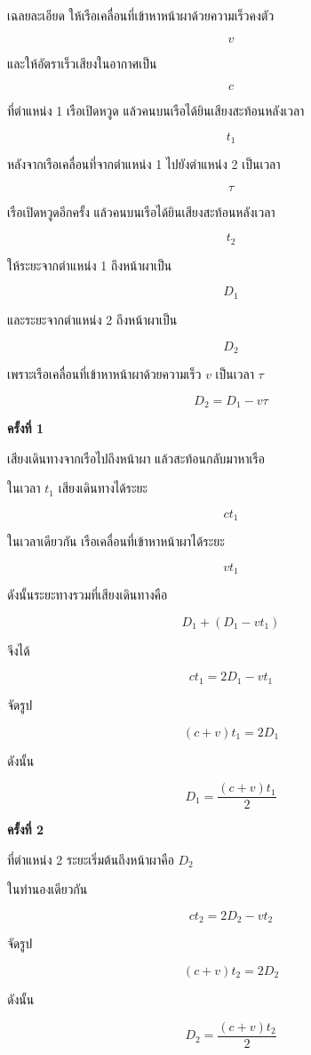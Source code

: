\begin{examplebox}{เฉลยละเอียด}
ให้เรือเคลื่อนที่เข้าหาหน้าผาด้วยความเร็วคงตัว

\[
v
\]

และให้อัตราเร็วเสียงในอากาศเป็น

\[
c
\]

ที่ตำแหน่ง 1 เรือเปิดหวูด แล้วคนบนเรือได้ยินเสียงสะท้อนหลังเวลา

\[
t_1
\]

หลังจากเรือเคลื่อนที่จากตำแหน่ง 1 ไปยังตำแหน่ง 2 เป็นเวลา

\[
\tau
\]

เรือเปิดหวูดอีกครั้ง แล้วคนบนเรือได้ยินเสียงสะท้อนหลังเวลา

\[
t_2
\]

ให้ระยะจากตำแหน่ง 1 ถึงหน้าผาเป็น

\[
D_1
\]

และระยะจากตำแหน่ง 2 ถึงหน้าผาเป็น

\[
D_2
\]

เพราะเรือเคลื่อนที่เข้าหาหน้าผาด้วยความเร็ว $v$ เป็นเวลา $\tau$

\[
D_2=D_1-v\tau
\]

\textbf{ครั้งที่ 1}

เสียงเดินทางจากเรือไปถึงหน้าผา แล้วสะท้อนกลับมาหาเรือ

ในเวลา $t_1$ เสียงเดินทางได้ระยะ

\[
ct_1
\]

ในเวลาเดียวกัน เรือเคลื่อนที่เข้าหาหน้าผาได้ระยะ

\[
vt_1
\]

ดังนั้นระยะทางรวมที่เสียงเดินทางคือ

\[
D_1+(D_1-vt_1)
\]

จึงได้

\[
ct_1=2D_1-vt_1
\]

จัดรูป

\[
(c+v)t_1=2D_1
\]

ดังนั้น

\[
D_1=\frac{(c+v)t_1}{2}
\]

\textbf{ครั้งที่ 2}

ที่ตำแหน่ง 2 ระยะเริ่มต้นถึงหน้าผาคือ $D_2$

ในทำนองเดียวกัน

\[
ct_2=2D_2-vt_2
\]

จัดรูป

\[
(c+v)t_2=2D_2
\]

ดังนั้น

\[
D_2=\frac{(c+v)t_2}{2}
\]


\end{examplebox}
